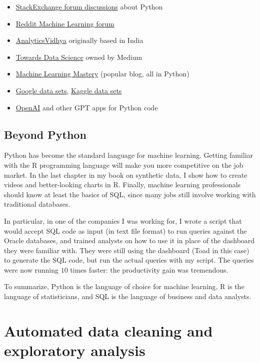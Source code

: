 \documentclass[oneside,10pt]{book}
\begin{document}
\begin{itemize}
\item \href{https://stackoverflow.com/questions/tagged/python}{StackExchange forum discussions} about Python 
\item \href{https://www.reddit.com/r/MachineLearning/}{Reddit Machine Learning forum} 
\item \href{https://www.analyticsvidhya.com/}{AnalyticsVidhya} originally based in India
\item \href{https://towardsdatascience.com/}{Towards Data Science} owned by Medium 
\item \href{https://machinelearningmastery.com/}{Machine Learning Mastery} (popular blog, all in Python)  
\item \href{https://datasetsearch.research.google.com/}{Google data sets}, \href{https://www.kaggle.com/datasets/}{Kaggle data sets} 
\item \href{https://openai.com/}{OpenAI} and other GPT apps for Python code
\end{itemize}


\subsection{Beyond Python}

Python has become the standard language for machine learning. Getting familiar with the R programming language will make you more competitive on the job market. In the last chapter in my book on synthetic data, 
 I show how to create videos and better-looking charts in R. Finally, machine learning professionals should know at least the basics of SQL, since many jobs still involve working with traditional databases. 

In particular, in one of the companies I was working for, I wrote a script that would accept SQL code as input (in text file format) to run queries against the Oracle databases, and trained analysts on how to use it in place of the dashboard they were familiar with. They were still using the dashboard (Toad in this case) to generate the SQL code, but run the actual queries with my script. The queries were now running $10$ times faster: the productivity gain was tremendous.  

To summarize, Python is the language of choice for machine learning, R is the language of statisticians, and SQL is the language of business and data analysts.

\section{Automated data cleaning and exploratory analysis}
\end{document}
